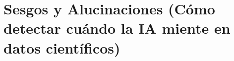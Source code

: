
\section[Sesgos y Alucinaciones]{Sesgos y Alucinaciones (Cómo detectar cuándo la IA miente en datos científicos)}

